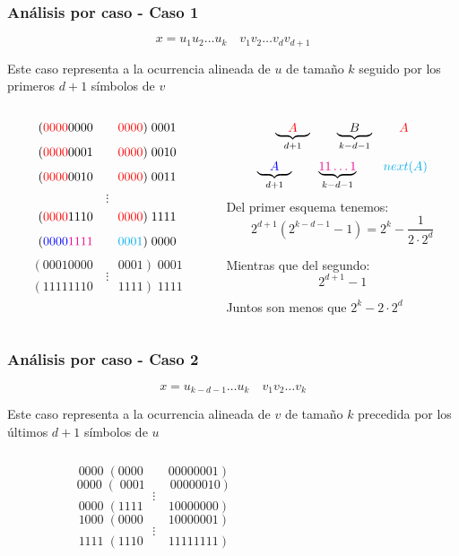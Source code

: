\documentclass[10pt,mathserif]{beamer}%
\begin{document}
\begin{frame}
  \frametitle{Análisis por caso - Caso 1}
    $$x = u_1 u_2 \dots u_k \quad v_1 v_2 \dots v_{d} v_{d + 1}$$

  Este caso representa a la ocurrencia alineada de $u$ de tamaño $k$ seguido por los primeros $d+1$ símbolos de $v$
  
  \begin{columns}
    \begin{column}{0.5\textwidth}
      $$( \textcolor{red}{0000}0000 \qquad \textcolor{red}{0000} ) \; 0001$$
      $$( \textcolor{red}{0000}0001 \qquad \textcolor{red}{0000} ) \; 0010$$
      $$( \textcolor{red}{0000}0010 \qquad \textcolor{red}{0000} ) \; 0011$$
      $$\vdots$$
      $$( \textcolor{red}{0000}1110 \qquad \textcolor{red}{0000} ) \; 1111$$
      $$( \textcolor{blue}{0000}\textcolor{magenta}{1111} \qquad \textcolor{cyan}{0001} ) \; 0000$$
      $$( 00010000 \qquad 0001 ) \; 0001$$
      $$\vdots$$
      $$( 11111110 \qquad 1111 ) \; 1111$$
    \end{column}
    \begin{column}{0.5\textwidth}  %
          \pause
          $$\underbrace{\quad \textcolor{red}{A} \quad }_{d +1} \qquad \underbrace{\quad B \quad }_{k - d - 1}  \qquad \textcolor{red}{A}$$
          $$\underbrace{\quad \textcolor{blue}{A} \quad }_{d +1} \qquad \underbrace{ \textcolor{magenta}{11 \dots 1  }}_{k - d - 1}  \qquad \textcolor{cyan}{next(A)} $$
          \pause
          Del primer esquema tenemos:
          $$2^{d + 1}  (2^{k - d - 1} - 1) =  2^k - \frac{1}{2\cdot2^{d} }$$
        
          Mientras que del segundo:
          $$2^{d + 1}   - 1$$

          Juntos son menos que $2^k -  2\cdot 2^d$
    \end{column}
    \end{columns}
\end{frame} 

\begin{frame}
  \frametitle{Análisis por caso - Caso 2}
  $$ x = u_{k-d-1} \dots u_k \quad v_1 v_2 \dots v_k$$

  Este caso representa a la ocurrencia alineada de $v$ de tamaño $k$ precedida por los últimos $d+1$ símbolos de $u$
  
  \begin{columns}
    \begin{column}{0.5\textwidth}
      $$0000 \; (0000 \qquad 00000001)$$
      $$0000 \; (\; 0001 \qquad 00000010)$$
      $$\vdots$$
      $$0000 \; (1111 \qquad 10000000)$$
      $$1000 \; (0000 \qquad 10000001)$$
      $$\vdots$$
      $$1111 \; (1110 \qquad 11111111)$$
    \end{column}
    \begin{column}{0.5\textwidth}  %
          
    \end{column}
    \end{columns}
\end{frame} 
\end{document}
